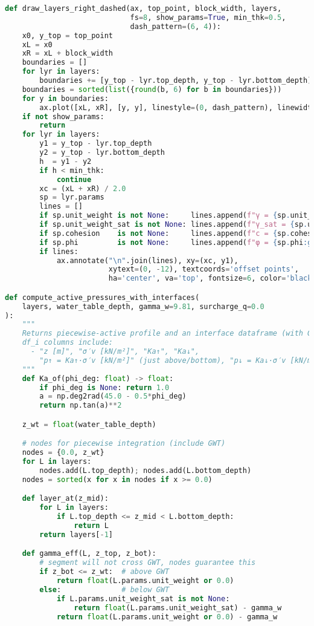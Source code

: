 \begin{lstlisting}[language=Python]
def draw_layers_right_dashed(ax, top_point, block_width, layers,
                             fs=8, show_params=True, min_thk=0.5,
                             dash_pattern=(6, 4)):
    x0, y_top = top_point
    xL = x0
    xR = xL + block_width
    boundaries = []
    for lyr in layers:
        boundaries += [y_top - lyr.top_depth, y_top - lyr.bottom_depth]
    boundaries = sorted(list({round(b, 6) for b in boundaries}))
    for y in boundaries:
        ax.plot([xL, xR], [y, y], linestyle=(0, dash_pattern), linewidth=1.2, color="black")
    if not show_params:
        return
    for lyr in layers:
        y1 = y_top - lyr.top_depth
        y2 = y_top - lyr.bottom_depth
        h  = y1 - y2
        if h < min_thk: 
            continue
        xc = (xL + xR) / 2.0
        sp = lyr.params
        lines = []
        if sp.unit_weight is not None:     lines.append(f"γ = {sp.unit_weight:g} kN/m³")
        if sp.unit_weight_sat is not None: lines.append(f"γ_sat = {sp.unit_weight_sat:g} kN/m³")
        if sp.cohesion    is not None:     lines.append(f"c = {sp.cohesion:g} kPa")
        if sp.phi         is not None:     lines.append(f"φ = {sp.phi:g}°")
        if lines:
            ax.annotate("\n".join(lines), xy=(xc, y1),
                        xytext=(0, -12), textcoords='offset points',
                        ha='center', va='top', fontsize=6, color='black')

def compute_active_pressures_with_interfaces(
    layers, water_table_depth, gamma_w=9.81, surcharge_q=0.0
):
    """
    Returns piecewise-active profile and an interface dataframe (with GWT included).
    df_i columns include:
      - "z [m]", "σ′v [kN/m²]", "Ka↑", "Ka↓",
        "p↑ = Ka↑·σ′v [kN/m²]" (just above/bottom), "p↓ = Ka↓·σ′v [kN/m²]" (just below/top)
    """
    def Ka_of(phi_deg: float) -> float:
        if phi_deg is None: return 1.0
        a = np.deg2rad(45.0 - 0.5*phi_deg)
        return np.tan(a)**2

    z_wt = float(water_table_depth)

    # nodes for piecewise integration (include GWT)
    nodes = {0.0, z_wt}
    for L in layers:
        nodes.add(L.top_depth); nodes.add(L.bottom_depth)
    nodes = sorted(x for x in nodes if x >= 0.0)

    def layer_at(z_mid):
        for L in layers:
            if L.top_depth <= z_mid < L.bottom_depth:
                return L
        return layers[-1]

    def gamma_eff(L, z_top, z_bot):
        # segment will not cross GWT, nodes guarantee this
        if z_bot <= z_wt:  # above GWT
            return float(L.params.unit_weight or 0.0)
        else:              # below GWT
            if L.params.unit_weight_sat is not None:
                return float(L.params.unit_weight_sat) - gamma_w
            return float(L.params.unit_weight or 0.0) - gamma_w


\end{lstlisting}

